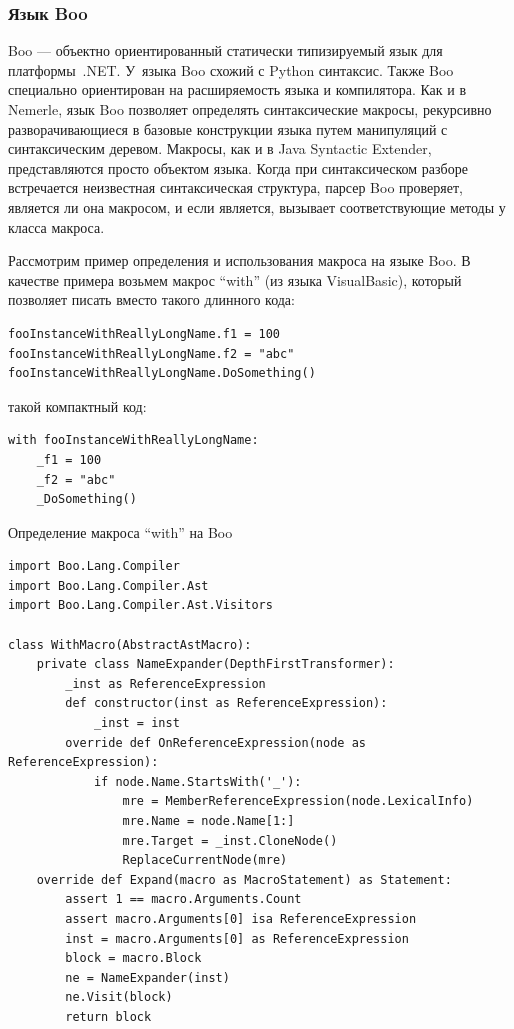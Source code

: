 \documentclass[a4paper,12pt,titlepage]{extarticle}
\begin{document}
\subsubsection*{Язык Boo}
Boo --- объектно ориентированный статически типизируемый язык для платформы~.NET.
У~языка Boo схожий с Python синтаксис. Также Boo специально ориентирован на
расширяемость языка и компилятора. Как и в Nemerle, язык Boo позволяет
определять синтаксические макросы, рекурсивно разворачивающиеся в базовые
конструкции языка путем манипуляций с синтаксическим деревом. Макросы, как и в
Java Syntactic Extender, представляются просто объектом языка. Когда при
синтаксическом разборе встречается неизвестная синтаксическая структура, парсер
Boo проверяет, является ли она макросом, и если является, вызывает
соответствующие методы у класса макроса.

Рассмотрим пример определения и использования макроса на языке Boo. В качестве
примера возьмем макрос ``with'' (из языка VisualBasic), который позволяет писать
вместо такого длинного кода:
\begin{verbatim}
fooInstanceWithReallyLongName.f1 = 100
fooInstanceWithReallyLongName.f2 = "abc"
fooInstanceWithReallyLongName.DoSomething()
\end{verbatim}
такой компактный код:
\begin{verbatim}
with fooInstanceWithReallyLongName:
    _f1 = 100
    _f2 = "abc"
    _DoSomething()
\end{verbatim}

Определение макроса ``with'' на Boo
\begin{verbatim}
import Boo.Lang.Compiler
import Boo.Lang.Compiler.Ast
import Boo.Lang.Compiler.Ast.Visitors

class WithMacro(AbstractAstMacro):
    private class NameExpander(DepthFirstTransformer):
        _inst as ReferenceExpression
        def constructor(inst as ReferenceExpression):
            _inst = inst
        override def OnReferenceExpression(node as ReferenceExpression):
            if node.Name.StartsWith('_'):
                mre = MemberReferenceExpression(node.LexicalInfo)
                mre.Name = node.Name[1:]
                mre.Target = _inst.CloneNode()
                ReplaceCurrentNode(mre)
    override def Expand(macro as MacroStatement) as Statement:
        assert 1 == macro.Arguments.Count
        assert macro.Arguments[0] isa ReferenceExpression
        inst = macro.Arguments[0] as ReferenceExpression
        block = macro.Block
        ne = NameExpander(inst)
        ne.Visit(block)
        return block
\end{verbatim}
\end{document}
